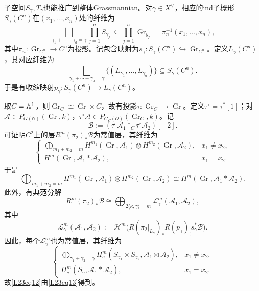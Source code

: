子空间$S_\gamma,T_\gamma$也能推广到整体Grassmannian。对$\gamma\in X^\vee$，相应的ind子概形$S_\gamma(C^n)$在$(x_1,\ldots,x_n)$处的纤维为
\[\bigsqcup_{\gamma_1+\cdots+\gamma_a=\gamma}\prod_{j=1}^aS_{\gamma_j}\ \subseteq\prod_{j=1}^a\operatorname{Gr}_{y_j}=\pi_n^{-1}(x_1,\ldots,x_n),\]
其中$\pi_n:\operatorname{Gr}_{C^n}\to C^n$为投影。记包含映射为$s_\gamma:S_\gamma(C^n)\hookrightarrow\operatorname{Gr}_{C^n}$。定义$L_\gamma(C^n)$，其对应纤维为
\[\bigsqcup_{\gamma_1+\cdots+\gamma_a=\gamma}\{(L_{\gamma_1},\ldots,L_{\gamma_a})\}\subseteq S_\gamma(C^n).\]
于是有收缩映射$p_\gamma:S_\gamma(C^n)\to L_\gamma(C^n)$。

取$C=\mathbb{A}^1$，则$\operatorname{Gr}_C\cong\operatorname{Gr}\times C$，故有投影$\tau:\operatorname{Gr}_C\to\operatorname{Gr}$。定义$\tau^\circ=\tau^*[1]$；对$\mathcal A\in P_{G(\mathcal O)}(\operatorname{Gr},k)$，$\tau^\circ\mathcal A\in P_{G_C(\mathcal O)}(\operatorname{Gr}_C,k)$。记
\[\mathcal B:=(\tau^\circ\mathcal A_1*_C\tau^\circ\mathcal A_2)[-2].\]
可证明$C^2$上的层$R^m(\pi_2)_*\mathcal B$为常值层，其纤维为
\[\begin{cases}\displaystyle\bigoplus_{m_1+m_2=m}H^{m_1}(\operatorname{Gr},\mathcal A_1)\otimes H^{m_2}(\operatorname{Gr},\mathcal A_2),&x_1\ne x_2,\\H^m(\operatorname{Gr},\mathcal A_1*\mathcal A_2),&x_1=x_2.\end{cases}\]
于是
\[\bigoplus_{m_1+m_2=m}H^{m_1}(\operatorname{Gr},\mathcal A_1)\otimes H^{m_2}(\operatorname{Gr},\mathcal A_2)\cong H^m(\operatorname{Gr},\mathcal A_1*\mathcal A_2).\]
此外，有典范分解
\[R^m(\pi_2)_*\mathcal B\cong\bigoplus_{2\langle\kappa,\gamma\rangle=m}\mathcal L_\gamma^m(\mathcal A_1,\mathcal A_2),\]
其中
\[\mathcal L_\gamma^m(\mathcal A_1,\mathcal A_2):=\mathcal H^m\bigl(R(\pi_2|_{L_\gamma})_*R(p_\gamma)_!s_\gamma^*\mathcal B\bigr).\]
因此，每个$\mathcal L_\gamma^m$也为常值层，其纤维为
\[\begin{cases}\displaystyle\bigoplus_{\gamma_1+\gamma_2=\gamma}H_c^m(S_{\gamma_1}\times S_{\gamma_2},\mathcal A_1\boxtimes\mathcal A_2),&x_1\ne x_2,\\H_c^m(S_\gamma,\mathcal A_1*\mathcal A_2),&x_1=x_2.\end{cases}\]
故\eqref{L23eq12}由\eqref{L23eq13}得到。
